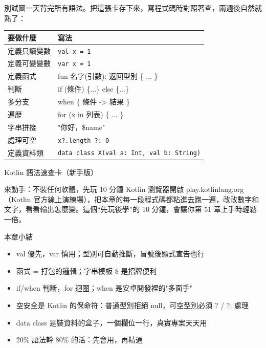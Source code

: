 
別試圖一天背完所有語法。把這張卡存下來，寫程式碼時對照著查，兩週後自然就熟了：

\begin{center}
\begin{tabularx}{\linewidth}{|X|X|}
\hline
\textbf{要做什麼} & \textbf{寫法} \tabularnewline
\hline
定義只讀變數 & \texttt{val x = 1} \tabularnewline
定義可變變數 & \texttt{var x = 1} \tabularnewline
定義函式 & fun 名字(引數): 返回型別 \{ ... \} \tabularnewline
判斷 & if (條件) \{...\} else \{...\} \tabularnewline
多分支 & when \{ 條件 -> 結果 \} \tabularnewline
遍歷 & for (x in 列表) \{ ... \} \tabularnewline
字串拼接 & "你好，\$name" \tabularnewline
處理可空 & \texttt{x?.\allowbreak length ?: 0} \tabularnewline
定義資料類 & \texttt{data class X(val a: Int, val b: String)} \tabularnewline
\hline
\end{tabularx}
\end{center}

\begin{center}\small\color{gray}Kotlin 語法速查卡（新手版）\end{center}

\begin{tcbpractice}{來動手：不裝任何軟體，先玩 10 分鐘 Kotlin}
瀏覽器開啟 play.kotlinlang.org（Kotlin 官方線上演練場），把本章的每一段程式碼都粘進去跑一遍，改改數字和文字，看看輸出怎麼變。這個“先玩後學”的 10 分鐘，會讓你第 51 章上手時輕鬆一倍。

\end{tcbpractice}

\begin{tcbsummary}{本章小結}
\begin{itemize}
  \item val 優先，var 慎用；型別可自動推斷，冒號後顯式宣告也行
  \item 函式 = 打包的邏輯；字串模板 \$ 是招牌便利
  \item if/when 判斷，for 迴圈；when 是安卓開發裡的"多面手"
  \item 空安全是 Kotlin 的保命符：普通型別拒絕 null，可空型別必須 ? / ?: 處理
  \item data class 是裝資料的盒子，一個欄位一行，真實專案天天用
  \item 20\% 語法幹 80\% 的活：先會用，再精通
\end{itemize}

\end{tcbsummary}
